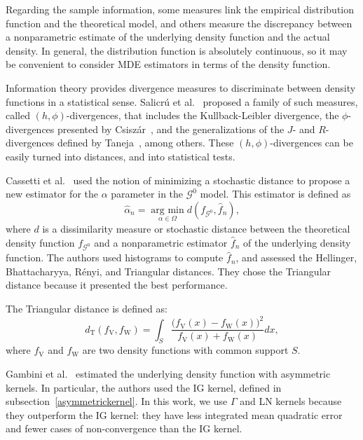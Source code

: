 \documentclass[twocolumn]{svjour3}
\newcommand{\argmin}{\operatorname*{\text{arg min }}}
\begin{document}
Regarding the sample information, some measures link the empirical distribution function and the theoretical model, and others measure the discrepancy between a nonparametric estimate of the underlying density function and the actual density. 
In general, the distribution function is absolutely continuous, so it may be convenient to consider MDE estimators in terms of the density function. 

Information theory provides divergence measures to discriminate between density functions in a statistical sense. 
Salicr\'u et al.~\cite{Salicru1994} proposed a family of such measures, called $(h,\phi)$-divergences, that includes the Kullback-Leibler divergence,  
the $\phi$-divergences presented by Csisz\'ar~\cite{Csiszar1967}, 
and the generalizations of the $J$- and $R$-divergences defined by Taneja~\cite{Taneja1989}, among others.
These $(h,\phi)$-divergences can be easily turned into distances, and into statistical tests.

Cassetti et al.~\cite{APSAR2013ParameterEstimationStochasticDistances} used the notion of minimizing a stochastic distance to propose a new estimator for the $\alpha$ parameter in the $\mathcal{G}^0$ model. 
This estimator is defined as
\begin{equation}
	\widehat{\alpha}_n=\argmin_{\alpha\in\Omega} d(f_{\mathcal{G}^0}, \widehat{f}_n),
	\label{MDE}
\end{equation}
where $d$ is a dissimilarity measure or stochastic distance between the theoretical density function $f_{\mathcal{G}^0}$ and a nonparametric estimator $\widehat{f}_n$ of the underlying density function.
The authors used histograms to compute $\widehat{f}_n$, and assessed the Hellinger, Bhattacharyya, R\'enyi, and Triangular distances. 
They chose the Triangular distance because it presented the best performance.

The Triangular distance is defined as:
\begin{equation}
	d_{\text{{T}}}(f_{\text{{V}}},f_{\text{{W}}})=\int_{S}\frac{\big(f_{\text{{V}}}(x)-f_{\text{{W}}}(x)\big)^2}{f_{\text{{V}}}(x)+f_{\text{{W}}}(x)}dx,
	\label{DT}
\end{equation}
where $f_{\text{{V}}}$ and $f_{\text{{W}}}$ are two density functions with common support $S$.

Gambini et al.~\cite{gambini2015} estimated the underlying density function with asymmetric kernels.
In particular, the authors used the IG kernel, defined in subsection~\ref{asymmetrickernel}. 
In this work, we use $\Gamma$ and LN kernels because they outperform the IG kernel: they have less integrated mean quadratic error and fewer cases of non-convergence than the IG kernel.
\end{document}
